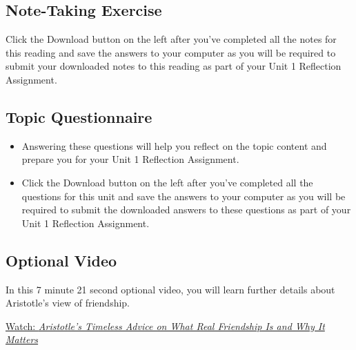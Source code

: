 \documentclass[
]{book}
\providecommand{\tightlist}{%
  \setlength{\itemsep}{0pt}\setlength{\parskip}{0pt}}
\begin{document}
\hypertarget{note-taking-exercise-2}{%
\subsection*{Note-Taking Exercise}\label{note-taking-exercise-2}}

\begin{reflect}
Click the Download button on the left after you've completed all the notes for this reading and save the answers to your computer as you will be required to submit your downloaded notes to this reading as part of your Unit 1 Reflection Assignment.
\end{reflect}

\hypertarget{topic-questionnaire-2}{%
\subsection*{Topic Questionnaire}\label{topic-questionnaire-2}}

\begin{reflect}
\begin{itemize}
\tightlist
\item
  Answering these questions will help you reflect on the topic content and prepare you for your Unit 1 Reflection Assignment.
\item
  Click the Download button on the left after you've completed all the questions for this unit and save the answers to your computer as you will be required to submit the downloaded answers to these questions as part of your Unit 1 Reflection Assignment.
\end{itemize}
\end{reflect}

\hypertarget{optional-video-2}{%
\subsection*{Optional Video}\label{optional-video-2}}

\begin{reflect}
In this 7 minute 21 second optional video, you will learn further details about Aristotle's view of friendship.

\href{https://www.youtube.com/watch?v=F18kSA8OxqY}{Watch: \emph{Aristotle's Timeless Advice on What Real Friendship Is and Why It Matters}}
\end{reflect}
\end{document}

